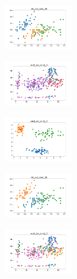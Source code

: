 \begin{figure}[H]
    \hfill
    \begin{subfigure}
        \centering
        \includegraphics[width=0.32\textwidth]{img/copkm2/iris_set_const_20_589741062_clust.png}
    \end{subfigure}
    \hfill
    \begin{subfigure}
        \centering
        \includegraphics[width=0.32\textwidth]{img/copkm2/ecoli_set_const_20_589741062_clust.png}
    \end{subfigure}
    \hfill
    \begin{subfigure}
        \centering
        \includegraphics[width=0.32\textwidth]{img/copkm2/rand_set_const_20_589741062_clust.png}
    \end{subfigure}
    \hfill
    \begin{subfigure}
        \centering
        \includegraphics[width=0.32\textwidth]{img/copkm2/iris_set_const_20_277451237_clust.png}
    \end{subfigure}
    \hfill
    \begin{subfigure}
        \centering
        \includegraphics[width=0.32\textwidth]{img/copkm2/ecoli_set_const_20_277451237_clust.png}

\end{subfigure}
\end{figure}
